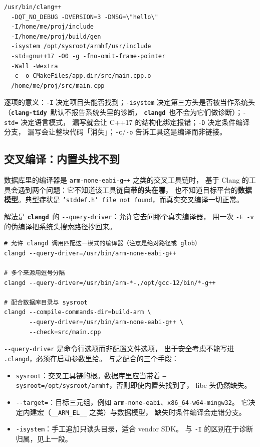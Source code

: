 \documentclass[12pt,a4paper,fontset=fandol]{ctexbook}
\newcommand{\cpp}[1]{C++#1}
\newcommand{\Opt}[1]{\texttt{-\/-#1}}
\newcommand{\Bk}{\discretionary{}{}{}}
\newcommand{\Lib}[1]{\textbf{\texttt{#1}}}
\newcommand{\Tidy}{\Lib{clang-tidy}}
\newcommand{\CD}{\Lib{clangd}}
\begin{document}
\begin{lstlisting}[style=jsonstyle,caption={一条典型 command 的组成（实际为 JSON 里的一行）},label={lst:ch02-long}]
/usr/bin/clang++
  -DQT_NO_DEBUG -DVERSION=3 -DMSG=\"hello\"
  -I/home/me/proj/include
  -I/home/me/proj/build/gen
  -isystem /opt/sysroot/armhf/usr/include
  -std=gnu++17 -O0 -g -fno-omit-frame-pointer
  -Wall -Wextra
  -c -o CMakeFiles/app.dir/src/main.cpp.o
  /home/me/proj/src/main.cpp
\end{lstlisting}

逐项的意义：\texttt{-I} 决定项目头能否找到；\texttt{-isystem}
决定第三方头是否被当作系统头（\Tidy\ 默认不报告系统头里的诊断，
\CD\ 也不会为它们做诊断）；\texttt{-std=} 决定语言模式，
漏写就会让 \cpp{17} 的结构化绑定报错；\texttt{-D} 决定条件编译分支，
漏写会让整块代码「消失」；\texttt{-c}/{\Bk}\texttt{-o} 告诉工具这是编译而非链接。

\subsection*{交叉编译：内置头找不到}

数据库里的编译器是 \texttt{arm-none-eabi-g++} 之类的交叉工具链时，
基于 Clang 的工具会遇到两个问题：它不知道该工具链\textbf{自带的头在哪}，
也不知道目标平台的\textbf{数据模型}。典型症状是
\texttt{'stddef.h' file not found}，而真实交叉编译一切正常。

解法是 \CD\ 的 \Opt{query-driver}：允许它去问那个真实编译器，
用一次 \texttt{-E -v} 的伪编译把系统头搜索路径抄回来。

\begin{lstlisting}[style=shellstyle,caption={用 query-driver 让 clangd 学习真实工具链},label={lst:ch02-qdriver}]
# 允许 clangd 调用匹配这一模式的编译器（注意是绝对路径或 glob）
clangd --query-driver=/usr/bin/arm-none-eabi-g++

# 多个来源用逗号分隔
clangd --query-driver=/usr/bin/arm-*-,/opt/gcc-12/bin/*-g++

# 配合数据库目录与 sysroot
clangd --compile-commands-dir=build-arm \
       --query-driver=/usr/bin/arm-none-eabi-g++ \
       --check=src/main.cpp
\end{lstlisting}

\Opt{query-driver} 是命令行选项而非配置文件选项，
出于安全考虑不能写进 \texttt{.clangd}，必须在启动参数里给。
与之配合的三个手段：

\begin{itemize}
  \item \texttt{sysroot}：交叉工具链的根。数据库里应当带着
        \texttt{--sysroot=/opt/sysroot/armhf}，否则即使内置头找到了，
        libc 头仍然缺失。
  \item \texttt{-\/-target=}：目标三元组，例如
        \texttt{arm-none-eabi}、\texttt{x86\_64-w64-mingw32}。
        它决定内建宏（\texttt{\_\_ARM\_EL\_\_} 之类）与数据模型，
        缺失时条件编译会走错分支。
  \item \texttt{-isystem}：手工追加只读头目录，适合 vendor SDK。
        与 \texttt{-I} 的区别在于诊断归属，见上一段。
\end{itemize}
\end{document}
